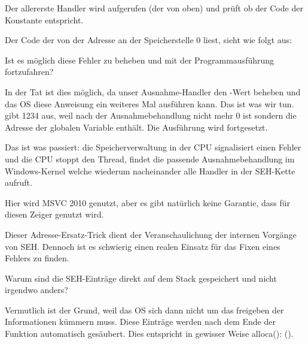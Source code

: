 Der allererste Handler wird aufgerufen (der von oben) und prüft ob der Code der Konstante
 entspricht.

Der Code der von der Adresse an der Speicherstelle 0 liest, sieht wie folgt aus:



Ist es möglich diese Fehler  zu beheben und mit der Programmausführung
fortzufahren?

In der Tat ist dies möglich, da unser Ausnahme-Handler den \EAX-Wert beheben und das
\ac{OS} diese Anweisung ein weiteres Mal ausführen kann.
Das ist was wir tun. \printf gibt 1234 aus, weil \EAX nach der Ausnahmebehandlung nicht
mehr 0 ist sondern die Adresse der globalen Variable  enthält.
Die Ausführung wird fortgesetzt.

Das ist was passiert: die Speicherverwaltung in der \ac{CPU} signalisiert einen Fehler und
die \ac{CPU} stoppt den Thread, findet die passende Ausnahmebehandlung im Windows-Kernel
welche wiederum nacheinander alle Handler in der \ac{SEH}-Kette aufruft.

Hier wird MSVC 2010 genutzt, aber es gibt natürlich keine Garantie, dass \EAX für diesen
Zeiger genutzt wird.

Dieser Adresse-Ersatz-Trick dient der Veranschaulichung der internen Vorgänge von \ac{SEH}.
Dennoch ist es schwierig einen realen Einsatz für das Fixen eines Fehlers 
zu finden.

Warum sind die SEH-Einträge direkt auf dem Stack gespeichert und nicht irgendwo anders?

Vermutlich ist der Grund, weil das \ac{OS} sich dann nicht um das freigeben der Informationen
kümmern muss. Diese Einträge werden nach dem Ende der Funktion automatisch gesäubert.
Dies entspricht in gewisser Weise alloca(): ().
